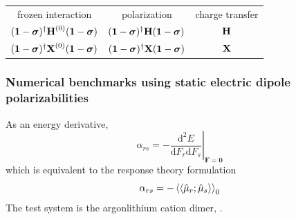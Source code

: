 \documentclass[%
    xcolor=usenames,dvipsnames,svgnames%
]{beamer}
\newcommand{\arlidimer}{\ce{Ar\bond{....}Li+}}
\begin{document}
\begin{frame}
\begin{table}
\begin{tabular}{ccc}
      frozen interaction & polarization & charge transfer \\
      \((\boldsymbol{\mathbf{1}} - \boldsymbol{\mathbf{\sigma}})^{\dagger} \boldsymbol{\mathbf{H}}^{(0)} (\boldsymbol{\mathbf{1}} - \boldsymbol{\mathbf{\sigma}})\) & \((\boldsymbol{\mathbf{1}} - \boldsymbol{\mathbf{\sigma}})^{\dagger} \boldsymbol{\mathbf{H}} (\boldsymbol{\mathbf{1}} - \boldsymbol{\mathbf{\sigma}})\) & \(\boldsymbol{\mathbf{H}}\) \\
      \((\boldsymbol{\mathbf{1}} - \boldsymbol{\mathbf{\sigma}})^{\dagger} \boldsymbol{\mathbf{X}}^{(0)} (\boldsymbol{\mathbf{1}} - \boldsymbol{\mathbf{\sigma}})\) & \((\boldsymbol{\mathbf{1}} - \boldsymbol{\mathbf{\sigma}})^{\dagger} \boldsymbol{\mathbf{X}} (\boldsymbol{\mathbf{1}} - \boldsymbol{\mathbf{\sigma}})\) & \(\boldsymbol{\mathbf{X}}\)
    \end{tabular}
  \end{table}
\end{frame}

\begin{frame}
  \frametitle{Numerical benchmarks using static electric dipole polarizabilities}
    As an energy derivative,
  \begin{equation*}
    \alpha_{rs} = - \left. \frac{\text{d}^{2}E}{\text{d}F_{r}\text{d}F_{s}} \right|_{\mathbf{F}=\mathbf{0}}
  \end{equation*}
  which is equivalent to the response theory formulation
  \begin{equation*}
    \alpha_{rs} = - \braket{\braket{\hat{\mu}_{r};\hat{\mu}_{s}}}_{0}
  \end{equation*}
  The test system is the argon\textemdash{}lithium cation dimer, \arlidimer{}.
\end{frame}
\end{document}
